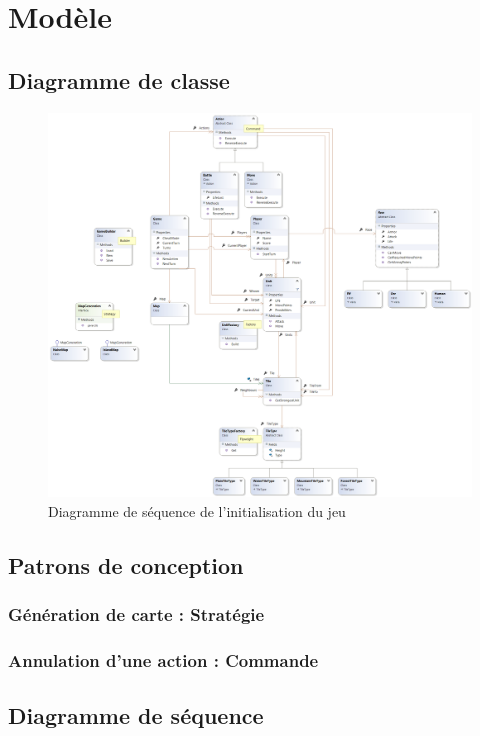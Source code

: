 \section{Modèle}

\subsection{Diagramme de classe}

\begin{figure}[h]
  \centering
  \includegraphics[width=13cm]{schemas/ClassDiagram.png}
  \caption{Diagramme de séquence de l'initialisation du jeu}
  \label{sd_init}
\end{figure}

\subsection{Patrons de conception}
\subsubsection{Génération de carte : Stratégie}
\subsubsection{Annulation d'une action : Commande}

\subsection{Diagramme de séquence}

